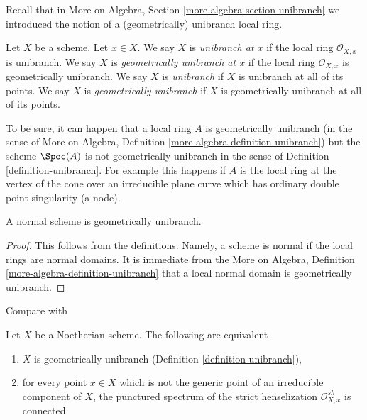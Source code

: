 \noindent
Recall that in More on Algebra, Section \ref{more-algebra-section-unibranch}
we introduced the notion of a (geometrically) unibranch local ring.

\begin{definition}
\label{definition-unibranch}
\begin{reference}
\cite[Chapter IV (6.15.1)]{EGA4}
\end{reference}
Let $X$ be a scheme. Let $x \in X$. We say $X$ is {\it unibranch at $x$}
if the local ring $\mathcal{O}_{X, x}$ is unibranch. We say $X$ is
{\it geometrically unibranch at $x$}
if the local ring $\mathcal{O}_{X, x}$ is geometrically unibranch.
We say $X$ is {\it unibranch} if $X$ is unibranch at all of its points.
We say $X$ is {\it geometrically unibranch} if $X$ is
geometrically unibranch at all of its points.
\end{definition}

\noindent
To be sure, it can happen that a local ring $A$ is geometrically unibranch
(in the sense of
More on Algebra, Definition \ref{more-algebra-definition-unibranch})
but the scheme $\Spec(A)$ is not geometrically unibranch in the sense
of Definition \ref{definition-unibranch}. For example this happens
if $A$ is the local ring at the vertex of the cone over an irreducible
plane curve which has ordinary double point singularity (a node).

\begin{lemma}
\label{lemma-normal-geometrically-unibranch}
A normal scheme is geometrically unibranch.
\end{lemma}

\begin{proof}
This follows from the definitions. Namely, a scheme
is normal if the local rings are normal domains. It is immediate
from the More on Algebra, Definition \ref{more-algebra-definition-unibranch}
that a local normal domain is geometrically unibranch.
\end{proof}

\begin{lemma}
\label{lemma-geometrically-unibranch}
\begin{reference}
Compare with \cite[Proposition 2.3]{Etale-coverings}
\end{reference}
Let $X$ be a Noetherian scheme. The following are equivalent
\begin{enumerate}
\item $X$ is geometrically unibranch (Definition \ref{definition-unibranch}),
\item for every point $x \in X$ which is not the generic point of
an irreducible component of $X$, the punctured spectrum of the
strict henselization $\mathcal{O}_{X, x}^{sh}$ is connected.
\end{enumerate}
\end{lemma}

